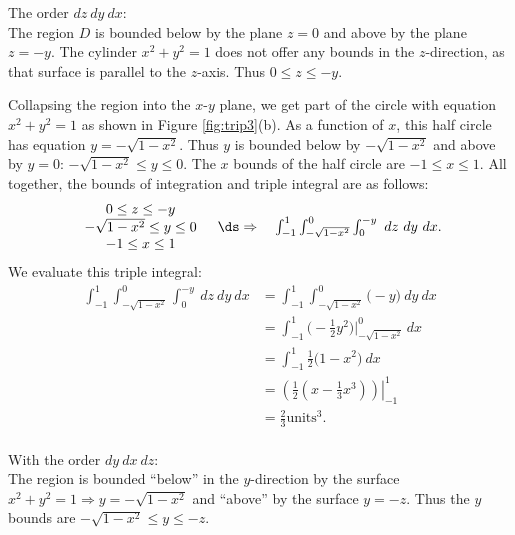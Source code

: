 {The order $dz\ dy\ dx$:\\

The region $D$ is bounded below by the plane $z=0$ and above by the plane $z=-y$. The cylinder $x^2+y^2=1$ does not offer any bounds in the $z$-direction, as that surface is parallel to the $z$-axis. Thus $0\leq z\leq -y$.

Collapsing the region into the $x$-$y$ plane, we get part of the circle with equation $x^2+y^2=1$ as shown in Figure \ref{fig:trip3}(b). As a function of $x$, this half circle has equation $y=-\sqrt{1-x^2}$. Thus $y$ is bounded below by $-\sqrt{1-x^2}$ and above by $y=0$: $-\sqrt{1-x^2}\leq y\leq 0$. The $x$ bounds of the half circle are $-1\leq x\leq 1$. All together, the bounds of integration and triple integral are  as follows:
$$\begin{array}{cc}
		\begin{array}{c}
		0\leq z\leq -y\\
		-\sqrt{1-x^2}\leq y\leq 0\\
		-1\leq x\leq 1
		\end{array} 
		&
		\ds\Rightarrow \quad \int_{-1}^1\int_{-\sqrt{1-x^2}}^{0}\int_0^{-y}\ dz\ dy\ dx.
	\end{array}
$$
We evaluate this triple integral:
\begin{align*}
\int_{-1}^1\int_{-\sqrt{1-x^2}}^{0}\int_0^{-y}\ dz\ dy\ dx &= \int_{-1}^1\int_{-\sqrt{1-x^2}}^{0}\big(-y\big)\ dy\ dx\\
				&=\int_{-1}^1\big(-\frac12y^2\big)\Big|_{-\sqrt{1-x^2}}^{0}\ dx\\
				&= \int_{-1}^1 \frac12\big(1-x^2\big)\ dx\\
				&= \left.\left(\frac12\left(x-\frac13x^3\right)\right)\right|_{-1}^1\\
				&= \frac23\text{units}^3.
\end{align*}\\
\clearpage
\noindent With the order $dy\ dx\ dz$:\\

The region is bounded ``below'' in the $y$-direction by the surface $x^2+y^2=1 \Rightarrow y=-\sqrt{1-x^2}$ and ``above'' by the surface $y=-z$. Thus the $y$ bounds are $-\sqrt{1-x^2}\leq y\leq -z$.


}
